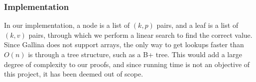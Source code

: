 \subsubsection{Implementation}
In our implementation, a node is a list of $(k, p)$ pairs, and a leaf is a list of $(k, v)$ pairs, through which we perform a linear search to find the correct value. Since Gallina does not support arrays, the only way to get lookups faster than $O(n)$ is through a tree structure, such as a B+ tree. This would add a large degree of complexity to our proofs, and since running time is not an objective of this project, it has been deemed out of scope.